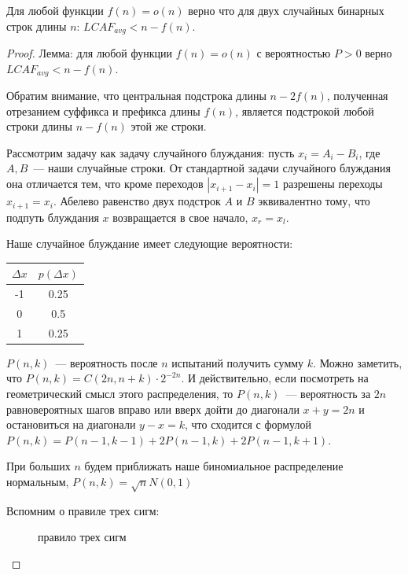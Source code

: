 \begin{theorem} %
Для любой функции $f(n)=o(n)$ верно что для двух случайных бинарных строк длины $n$: $LCAF_{avg} < n - f(n)$.
\end{theorem}
\begin{proof}

Лемма: для любой функции $f(n)=o(n)$ с вероятностью $P>0$ верно $LCAF_{avg} < n - f(n)$.

Обратим внимание, что центральная подстрока длины $n-2f(n)$, полученная отрезанием суффикса и префикса длины $f(n)$, является подстрокой любой строки длины $n-f(n)$ этой же строки.

Рассмотрим задачу как задачу случайного блуждания: пусть $x_i = A_i - B_i$, где $A, B$~--- наши случайные строки. От стандартной задачи случайного блуждания она отличается тем, что кроме переходов $|x_{i+1}-x_i|=1$ разрешены переходы $x_{i+1}=x_i$. Абелево равенство двух подстрок $A$ и $B$ эквивалентно тому, что подпуть блуждания $x$ возвращается в свое начало, $x_r=x_l$.

Наше случайное блуждание имеет следующие вероятности:

\begin{tabular}{|c|c|}
\hline
$\Delta x$ & $p(\Delta x)$ \\
\hline
-1 & 0.25 \\
\hline
0 & 0.5 \\
\hline
1 & 0.25 \\
\hline
\end{tabular}

$P(n, k)$~--- вероятность после $n$ испытаний получить сумму $k$. Можно заметить, что $P(n, k)=C(2n, n+k)\cdot 2^{-2n}$. И действительно, если посмотреть на геометрический смысл этого распределения, то $P(n,k)$~--- вероятность за $2n$ равновероятных шагов вправо или вверх дойти до диагонали $x+y=2n$ и остановиться на диагонали $y-x=k$, что сходится с формулой $P(n,k)=P(n-1,k-1)+2P(n-1,k)+2P(n-1,k+1)$.

При больших $n$ будем приближать наше биномиальное распределение нормальным, $P(n, k)=\sqrt n N(0,1)$ %

Вспомним о правиле трех сигм:

\begin{figure}[h]
\caption{правило трех сигм \cite{3}}
\end{figure}


\end{proof}
